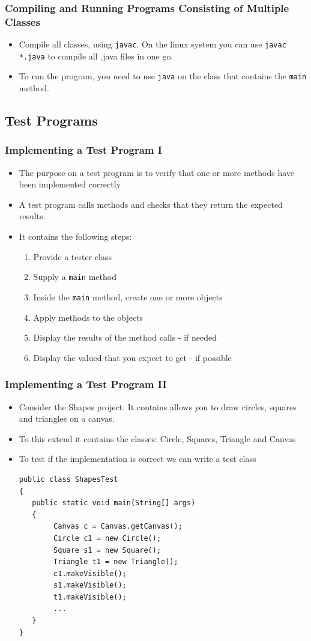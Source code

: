 \begin{frame}[fragile]
\frametitle{Compiling and Running Programs Consisting of Multiple Classes}
\begin{itemize}
\item Compile all classes, using \lstinline!javac!. On the linux system you can use \lstinline!javac *.java! to compile all .java files in one go.
\item To run the program, you need to use \lstinline!java! on the class that contains the \lstinline!main! method. 
\end{itemize}
\end{frame}

\subsection{Test Programs}

\begin{frame}[fragile]
\frametitle{Implementing a Test Program I}
\begin{itemize}
\item The purpose on a test program is to verify that one or more methods have been implemented correctly
\item A test program calls methods and checks that they return the expected results. 
\item It contains the following steps:
\begin{enumerate}
\item Provide a tester class
\item Supply a \lstinline!main! method
\item Inside the \lstinline!main! method, create one or more objects
\item Apply methods to the objects
\item Display the results of the method calls - if needed
\item Display the valued that you expect to get - if possible
\end{enumerate}
\end{itemize}
\end{frame}

\begin{frame}[fragile]
\frametitle{Implementing a Test Program II}
\begin{itemize}
\item Consider the Shapes project. It contains allows you to draw circles, squares and triangles on a canvas. 
\item To this extend it contains the classes: Circle, Squares, Triangle and Canvas
\item To test if the implementation is correct we can write a test class
\codelist
\codesmall
\begin{lstlisting}
public class ShapesTest
{
   public static void main(String[] args)
   {
        Canvas c = Canvas.getCanvas();
        Circle c1 = new Circle();
        Square s1 = new Square();
        Triangle t1 = new Triangle();
        c1.makeVisible();
        s1.makeVisible();
        t1.makeVisible();
        ...
   }
}
\end{lstlisting}
\end{itemize}
\end{frame}

